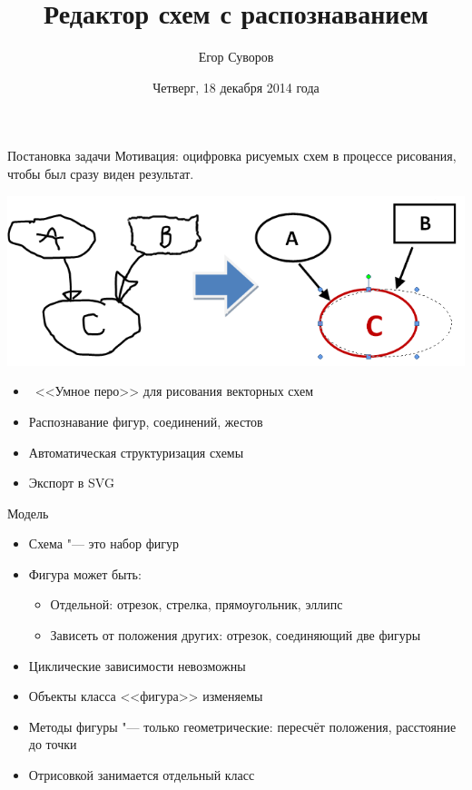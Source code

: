 \documentclass[utf8,xcolor=table]{beamer}
\title{Редактор схем с распознаванием}
\author{Егор Суворов}
\institute[CSCenter]{Практика, осень 2014\\Куратор: Евгений Линский}
\date[18.12.2014]{Четверг, 18 декабря 2014 года}
\begin{document}
\begin{frame}
\titlepage
\end{frame}

\begin{frame}[t]{Постановка задачи}
  Мотивация: оцифровка рисуемых схем в процессе рисования,
  чтобы был сразу виден результат.

  \includegraphics[width=\textwidth]{problem}
  \begin{itemize}
  \item~<<Умное перо>> для рисования векторных схем
  \item Распознавание фигур, соединений, жестов
  \item Автоматическая структуризация схемы
  \item Экспорт в SVG
  \end{itemize}
\end{frame}

\begin{frame}[t]{Модель}
  \begin{itemize}
  \item Схема "--- это набор фигур
  \item Фигура может быть:
    \begin{itemize}
    \item Отдельной: отрезок, стрелка, прямоугольник, эллипс
    \item Зависеть от положения других: отрезок, соединяющий две фигуры
    \end{itemize}
  \item Циклические зависимости невозможны
  \item Объекты класса <<фигура>> изменяемы
  \item Методы фигуры "--- только геометрические: пересчёт положения, расстояние до точки
  \item Отрисовкой занимается отдельный класс
  \end{itemize}
\end{frame}
\end{document}
